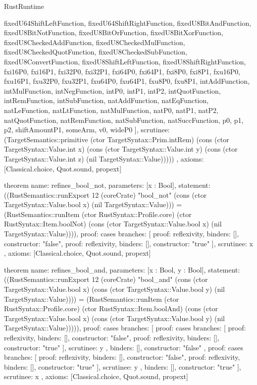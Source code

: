 \begin{lexlean}{RustRuntime}
\begin{semanticmodule}
{{      fixedU64ShiftLeftFunction,
      fixedU64ShiftRightFunction,
      fixedU8BitAndFunction,
      fixedU8BitNotFunction,
      fixedU8BitOrFunction,
      fixedU8BitXorFunction,
      fixedU8CheckedAddFunction,
      fixedU8CheckedMulFunction,
      fixedU8CheckedQuotFunction,
      fixedU8CheckedSubFunction,
      fixedU8ConvertFunction,
      fixedU8ShiftLeftFunction,
      fixedU8ShiftRightFunction,
      fxi16P0,
      fxi16P1,
      fxi32P0,
      fxi32P1,
      fxi64P0,
      fxi64P1,
      fxi8P0,
      fxi8P1,
      fxu16P0,
      fxu16P1,
      fxu32P0,
      fxu32P1,
      fxu64P0,
      fxu64P1,
      fxu8P0,
      fxu8P1,
      intAddFunction,
      intMulFunction,
      intNegFunction,
      intP0,
      intP1,
      intP2,
      intQuotFunction,
      intRemFunction,
      intSubFunction,
      natAddFunction,
      natEqFunction,
      natLeFunction,
      natLtFunction,
      natMulFunction,
      natP0,
      natP1,
      natP2,
      natQuotFunction,
      natRemFunction,
      natSubFunction,
      natSuccFunction,
      p0,
      p1,
      p2,
      shiftAmountP1,
      someArm,
      v0,
      wideP0
    ],
    scrutinee: (TargetSemantics::primitive (ctor TargetSyntax::Prim.intRem) (cons (ctor TargetSyntax::Value.int x) (cons (ctor TargetSyntax::Value.int y) (cons (ctor TargetSyntax::Value.int z) (nil TargetSyntax::Value)))))
  },
  axioms: [Classical.choice, Quot.sound, propext]
}

theorem{
  name: refines_bool_not,
  parameters: [x : Bool],
  statement: ((RustSemantics::runExport 12 (coreCrate) "bool_not" (cons (ctor TargetSyntax::Value.bool x) (nil TargetSyntax::Value))) = (RustSemantics::runItem (ctor RustSyntax::Profile.core) (ctor RustSyntax::Item.boolNot) (cons (ctor TargetSyntax::Value.bool x) (nil TargetSyntax::Value)))),
  proof: cases{
    branches: [
      {proof: reflexivity{}, binders: [], constructor: "false"},
      {proof: reflexivity{}, binders: [], constructor: "true"}
    ],
    scrutinee: x
  },
  axioms: [Classical.choice, Quot.sound, propext]
}

theorem{
  name: refines_bool_and,
  parameters: [x : Bool, y : Bool],
  statement: ((RustSemantics::runExport 12 (coreCrate) "bool_and" (cons (ctor TargetSyntax::Value.bool x) (cons (ctor TargetSyntax::Value.bool y) (nil TargetSyntax::Value)))) = (RustSemantics::runItem (ctor RustSyntax::Profile.core) (ctor RustSyntax::Item.boolAnd) (cons (ctor TargetSyntax::Value.bool x) (cons (ctor TargetSyntax::Value.bool y) (nil TargetSyntax::Value))))),
  proof: cases{
    branches: [
      {
        proof: cases{
          branches: [
            {proof: reflexivity{}, binders: [], constructor: "false"},
            {proof: reflexivity{}, binders: [], constructor: "true"}
          ],
          scrutinee: y
        },
        binders: [],
        constructor: "false"
      },
      {
        proof: cases{
          branches: [
            {proof: reflexivity{}, binders: [], constructor: "false"},
            {proof: reflexivity{}, binders: [], constructor: "true"}
          ],
          scrutinee: y
        },
        binders: [],
        constructor: "true"
      }
    ],
    scrutinee: x
  },
  axioms: [Classical.choice, Quot.sound, propext]
}


\end{semanticmodule}
\end{lexlean}
